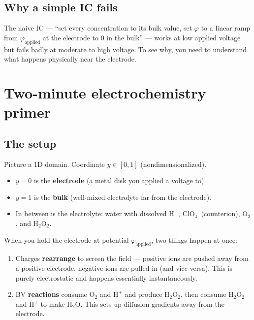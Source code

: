 \documentclass[11pt]{article}
\begin{document}
\subsection{Why a simple IC fails}

The naive IC --- ``set every concentration to its bulk value, set
$\varphi$ to a linear ramp from $\varphi_{\mathrm{applied}}$ at the
electrode to $0$ in the bulk'' --- works at low applied voltage but
fails badly at moderate to high voltage. To see why, you need to
understand what happens physically near the electrode.

\section{Two-minute electrochemistry primer}

\subsection{The setup}

Picture a 1D domain. Coordinate $y \in [0, 1]$ (nondimensionalized).

\begin{itemize}
\item $y = 0$ is the \textbf{electrode} (a metal disk you applied a
      voltage to).
\item $y = 1$ is the \textbf{bulk} (well-mixed electrolyte far from
      the electrode).
\item In between is the electrolyte: water with dissolved
      $\mathrm{H^+}$, $\mathrm{ClO_4^-}$ (counterion),
      $\mathrm{O_2}$, and $\mathrm{H_2O_2}$.
\end{itemize}

When you hold the electrode at potential $\varphi_{\mathrm{applied}}$,
two things happen at once:
\begin{enumerate}
\item Charges \textbf{rearrange} to screen the field --- positive ions
      are pushed away from a positive electrode, negative ions are
      pulled in (and vice-versa). This is purely electrostatic and
      happens essentially instantaneously.
\item BV \textbf{reactions} consume $\mathrm{O_2}$ and $\mathrm{H^+}$
      and produce $\mathrm{H_2O_2}$, then consume $\mathrm{H_2O_2}$
      and $\mathrm{H^+}$ to make $\mathrm{H_2O}$. This sets up
      diffusion gradients away from the electrode.
\end{enumerate}
\end{document}
